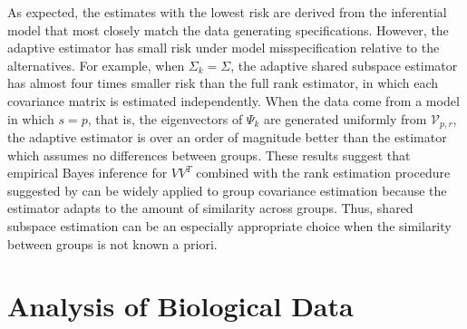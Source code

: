 \documentclass[12pt]{article}
\begin{document}
As expected, the estimates with the lowest risk are derived from the
inferential model that most closely match the data generating
specifications. However, the adaptive estimator has small risk under
model misspecification relative to the alternatives.  For example,
when $\Sigma_k = \Sigma$, the adaptive shared subspace estimator has
almost four times smaller risk than the full rank estimator, in which
each covariance matrix is estimated independently.  When the
data come from a model in which $s=p$, that is, the eigenvectors of $\Psi_k$
are generated uniformly from $\mathcal{V}_{p,r}$, the adaptive
estimator is over an order of magnitude better than the estimator
which assumes no differences between groups.  These results suggest
that empirical Bayes inference for $VV^T$ combined with the rank
estimation procedure suggested by \citet{Gavish2014} can be widely
applied to group covariance estimation because the estimator adapts to
the amount of similarity across groups.  Thus, shared subspace estimation
can be an especially appropriate choice when the similarity between
groups is not known a priori.  %



\section{Analysis of Biological Data}
\label{sec:app}
\end{document}
